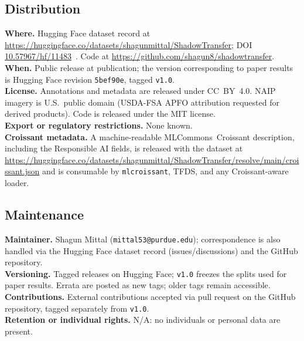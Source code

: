 \subsection{Distribution}
\label{sec:datasheet-distribution}
\textbf{Where.} Hugging Face dataset record at
\url{https://huggingface.co/datasets/shagunmittal/ShadowTransfer};
DOI \href{https://doi.org/10.57967/hf/11483}{10.57967/hf/11483}~\cite{mittal2026shadowtransferdata}. Code at \url{https://github.com/shagun8/shadowtransfer}.\\
\textbf{When.} Public release at publication; the version corresponding to paper
results is Hugging Face revision \texttt{5bef90e}, tagged \texttt{v1.0}.\\
\textbf{License.} Annotations and metadata are released under \mbox{CC~BY~4.0}.
NAIP imagery is U.S.\ public domain (USDA-FSA APFO attribution requested for
derived products). Code is released under the MIT license.\\
\textbf{Export or regulatory restrictions.} None known.\\
\textbf{Croissant metadata.} A machine-readable MLCommons~Croissant description,
including the Responsible AI fields, is released with the dataset at
\url{https://huggingface.co/datasets/shagunmittal/ShadowTransfer/resolve/main/croissant.json}
and is consumable by \texttt{mlcroissant}, TFDS, and any Croissant-aware loader.

\subsection{Maintenance}
\textbf{Maintainer.} Shagun Mittal (\texttt{mittal53@purdue.edu}); correspondence is also handled via the
Hugging Face dataset record (issues/discussions) and the GitHub repository.\\
\textbf{Versioning.} Tagged releases on Hugging Face; \texttt{v1.0} freezes the
splits used for paper results. Errata are posted as new tags; older tags remain
accessible.\\
\textbf{Contributions.} External contributions accepted via pull request on the
GitHub repository, tagged separately from \texttt{v1.0}.\\
\textbf{Retention or individual rights.} N/A: no individuals or personal data
are present.
